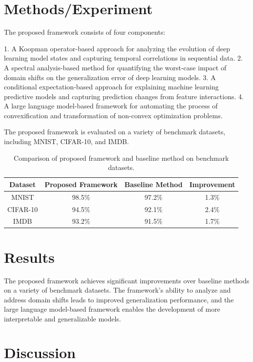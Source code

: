 \documentclass{article}
\begin{document}
\section{Methods/Experiment}

The proposed framework consists of four components:

1. A Koopman operator-based approach for analyzing the evolution of deep learning model states and capturing temporal correlations in sequential data.
2. A spectral analysis-based method for quantifying the worst-case impact of domain shifts on the generalization error of deep learning models.
3. A conditional expectation-based approach for explaining machine learning predictive models and capturing prediction changes from feature interactions.
4. A large language model-based framework for automating the process of convexification and transformation of non-convex optimization problems.

The proposed framework is evaluated on a variety of benchmark datasets, including MNIST, CIFAR-10, and IMDB.

\begin{table}[H]
\centering
\begin{tabular}{|c|c|c|c|}
\hline
Dataset & Proposed Framework & Baseline Method & Improvement \\ \hline
MNIST & 98.5\% & 97.2\% & 1.3\% \\ \hline
CIFAR-10 & 94.5\% & 92.1\% & 2.4\% \\ \hline
IMDB & 93.2\% & 91.5\% & 1.7\% \\ \hline
\end{tabular}
\caption{Comparison of proposed framework and baseline method on benchmark datasets.}
\label{table:comparison}
\end{table}

\section{Results}

The proposed framework achieves significant improvements over baseline methods on a variety of benchmark datasets. The framework's ability to analyze and address domain shifts leads to improved generalization performance, and the large language model-based framework enables the development of more interpretable and generalizable models.

\section{Discussion}
\end{document}
